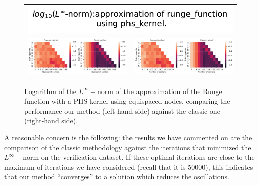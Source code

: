 \documentclass[12pt]{report} %
\begin{document}
\begin{figure}[h]
  \begin{tabular}{cc}
    \multicolumn{2}{c}{{\includegraphics[width=.5\textwidth]
    {imagenes/experiments/1d/variational/linf_runge_function_phs_kernel_Methods_Title.pdf}}}                                                                                       \\
    {\includegraphics[height=.4\textwidth, trim={0 0 11.5cm 0},clip=true]
    {imagenes/experiments/1d/variational/linf_runge_function_phs_kernel_Methods_Comparison.pdf}}  &
     {\includegraphics[height=.4\textwidth, trim={9.5cm 0 0 0},clip=true]{imagenes/experiments/1d/variational/linf_runge_function_phs_kernel_Methods_Comparison.pdf}} \\
  \end{tabular}
  \caption{Logarithm of the $L^\infty-$norm of the approximation of the Runge function with a PHS kernel using equispaced nodes, comparing the performance our method (left-hand side) against the classic one (right-hand side).}
  \label{fig:runge-function-phs-kernel-comparison-methods}
\end{figure}

A reasonable concern is the following: the results we have commented on are the comparison of the classic methodology against the iterations that minimized the $L^\infty-$norm on the verification dataset. If these optimal iterations are close to the maximum of iterations we have considered (recall that it is 50000), this indicates that our method ``converges'' to a solution which reduces the oscillations.
\end{document}
